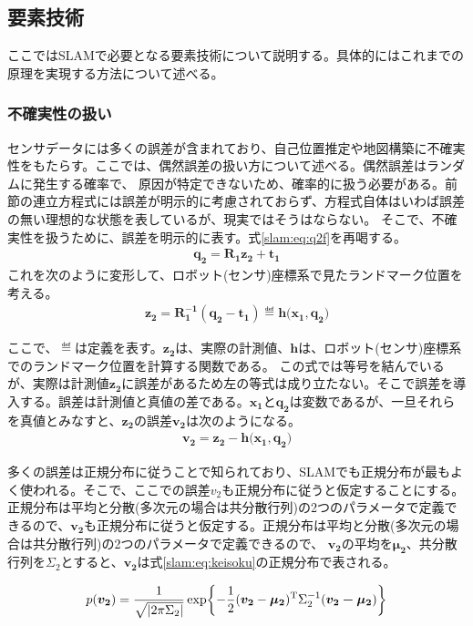 \subsection{要素技術}
ここではSLAMで必要となる要素技術について説明する。具体的にはこれまでの原理を実現する方法について述べる。

\subsubsection{不確実性の扱い}
センサデータには多くの誤差が含まれており、自己位置推定や地図構築に不確実性をもたらす。ここでは、偶然誤差の扱い方について述べる。偶然誤差はランダムに発生する確率で、
原因が特定できないため、確率的に扱う必要がある。前節の連立方程式には誤差が明示的に考慮されておらず、方程式自体はいわば誤差の無い理想的な状態を表しているが、現実ではそうはならない。
そこで、不確実性を扱うために、誤差を明示的に表す。式\eqref{slam:eq:q2f}を再喝する。
\begin{align*}
  \bm{q_2} = \bm{R_1z_2+t_1}
\end{align*}
これを次のように変形して、ロボット(センサ)座標系で見たランドマーク位置を考える。
\begin{align}
  \bm{z_2} = \bm{R_1^{-1}(q_2-t_1)}\eqdef \bm{h(x_1},\bm{q_2)}
\end{align}

ここで、$\eqdef$は定義を表す。$\bm{z_2}$は、実際の計測値、$\bm{h}$は、ロボット(センサ)座標系でのランドマーク位置を計算する関数である。
この式では等号を結んでいるが、実際は計測値$\bm{z_2}$に誤差があるため左の等式は成り立たない。そこで誤差を導入する。誤差は計測値と真値の差である。$\bm{x_1}$と$\bm{q_2}$は変数であるが、一旦それらを真値とみなすと、$\bm{z_2}$の誤差$\bm{v_2}$は次のようになる。
\begin{align}
  \bm{v_2} = \bm{z_2}-\bm{h(x_1},\bm{q_2)}
\end{align}

多くの誤差は正規分布に従うことで知られており、SLAMでも正規分布が最もよく使われる。そこで、ここでの誤差$v_2$も正規分布に従うと仮定することにする。
正規分布は平均と分散(多次元の場合は共分散行列)の2つのパラメータで定義できるので、$\bm{v_2}$も正規分布に従うと仮定する。正規分布は平均と分散(多次元の場合は共分散行列)の2つのパラメータで定義できるので、
$\bm{v_2}$の平均を$\bm{\mu_2}$、共分散行列を$\Sigma_2$とすると、$\bm{v_2}$は式\eqref{slam:eq:keisoku}の正規分布で表される。

\begin{align}
  p(\bm{v_2}) =\frac{1}{\sqrt{|2\pi\Sigma_2|}}\exp\biggl\{-\frac{1}{2}(\bm{v_2}-\bm{\mu_2})^{\rm{T}}\Sigma_2^{-1}(\bm{v_2-\mu_2})\biggr\}
\end{align}

